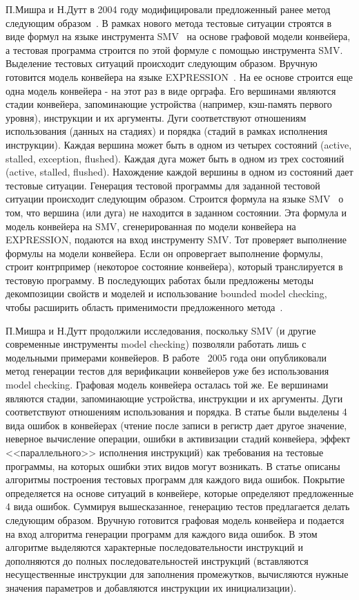 П.Мишра и Н.Дутт в 2004 году модифицировали предложенный ранее метод следующим образом~\cite{MishraDutt04}. В рамках нового метода тестовые ситуации строятся в виде формул на языке инструмента SMV~\cite{SMV} на основе графовой модели конвейера, а тестовая программа строится по этой формуле с помощью инструмента SMV. Выделение тестовых ситуаций происходит следующим образом. Вручную готовится модель конвейера на языке EXPRESSION~\cite{EXPRESSION}. На ее основе строится еще одна модель конвейера - на этот раз в виде орграфа. Его вершинами являются стадии конвейера, запоминающие устройства (например, кэш-память первого уровня), инструкции и их аргументы. Дуги соответствуют отношениям использования (данных на стадиях) и порядка (стадий в рамках исполнения инструкции). Каждая вершина может быть в одном из четырех состояний (active, stalled, exception, flushed). Каждая дуга может быть в одном из трех состояний (active, stalled, flushed). Нахождение каждой вершины в одном из состояний дает тестовые ситуации. Генерация тестовой программы для заданной тестовой ситуации происходит следующим образом. Строится формула на языке SMV~\cite{SMV} о том, что вершина (или дуга) не находится в заданном состоянии. Эта формула и модель конвейера на SMV, сгенерированная по модели конвейера на EXPRESSION, подаются на вход инструменту SMV. Тот проверяет выполнение формулы на модели конвейера. Если он опровергает выполнение формулы, строит контрпример (некоторое состояние конвейера), который транслируется в тестовую программу. В последующих работах были предложены методы декомпозиции свойств и моделей и использование bounded model checking, чтобы расширить область применимости предложенного метода~\cite{Mishra09}.

П.Мишра и Н.Дутт продолжили исследования, поскольку SMV (и другие современные инструменты model checking) позволяли работать лишь с модельными примерами конвейеров. В работе~\cite{MishraDutt05} 2005 года они опубликовали метод генерации тестов для верификации конвейеров уже без использования model checking. Графовая модель конвейера осталась той же. Ее вершинами являются стадии, запоминающие устройства, инструкции и их аргументы. Дуги соответствуют отношениям использования и порядка. В статье были выделены 4 вида ошибок в конвейерах (чтение после записи в регистр дает другое значение, неверное вычисление операции, ошибки в активизации стадий конвейера, эффект <<параллельного>> исполнения инструкций) как требования на тестовые программы, на которых ошибки этих видов могут возникать. В статье описаны алгоритмы построения тестовых программ для каждого вида ошибок. Покрытие определяется на основе ситуаций в конвейере, которые определяют предложенные 4 вида ошибок. Суммируя вышесказанное, генерацию тестов предлагается делать следующим образом. Вручную готовится графовая модель конвейера и подается на вход алгоритма генерации программ для каждого вида ошибок. В этом алгоритме выделяются характерные последовательности инструкций и  дополняются до полных последовательностей инструкций (вставляются несущественные инструкции для заполнения промежутков, вычисляются нужные значения параметров и добавляются инструкции их инициализации).

